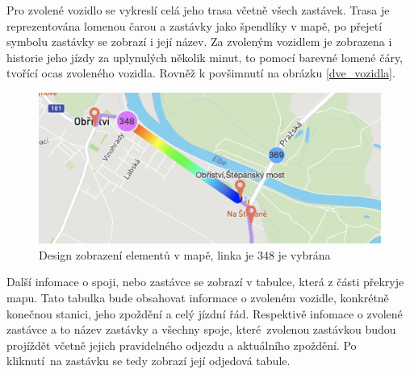 \bigbreak

Pro zvolené vozidlo se vykreslí celá jeho trasa včetně všech zastávek. Trasa je reprezentována lomenou čarou a zastávky jako špendlíky v mapě, po přejetí symbolu zastávky se zobrazí i její název. Za zvoleným vozidlem je zobrazena i historie jeho jízdy za uplynulých několik minut, to pomocí barevné lomené čáry, tvořící ocas zvoleného vozidla. Rovněž k povšimnutí na obrázku \ref{dve_vozidla}.

\begin{figure}
	\centering
  \includegraphics[width=0.5\linewidth]{../img/dve_vozidla.png}
  \caption{Design zobrazení elementů v mapě, linka je 348 je vybrána}
  \label{fig:dve_vozidla}
\end{figure}

Další infomace o spoji, nebo zastávce se zobrazí v tabulce, která z části překryje mapu. Tato tabulka bude obsahovat informace o zvoleném vozidle, konkrétně konečnou stanici, jeho zpoždění a celý jízdní řád. Respektivě infomace o zvolené zastávce a to název zastávky a všechny spoje, které zvolenou zastávkou budou projíždět včetně jejich pravidelného odjezdu a aktuálního zpoždění. Po kliknutí na zastávku se tedy zobrazí její odjedová tabule.
